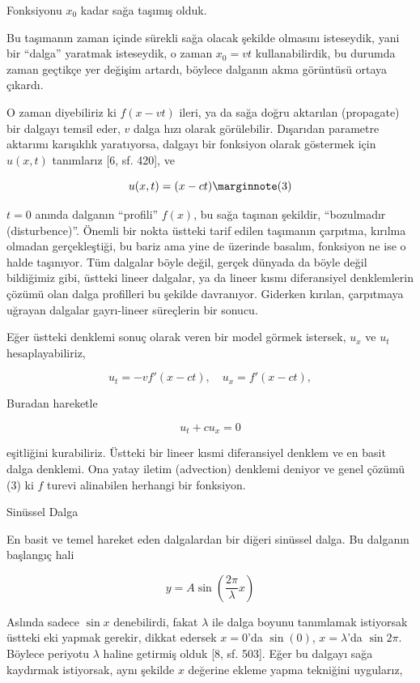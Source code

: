 \documentclass[12pt,fleqn]{article}\usepackage{../../common}
\begin{document}
Fonksiyonu $x_0$ kadar sağa taşımış olduk.

Bu taşımanın zaman içinde sürekli sağa olacak şekilde olmasını isteseydik, yani
bir ``dalga'' yaratmak isteseydik, o zaman $x_0 = v t$ kullanabilirdik, bu
durumda zaman geçtikçe yer değişim artardı, böylece dalganın akma görüntüsü
ortaya çıkardı.

O zaman diyebiliriz ki $f(x-vt)$ ileri, ya da sağa doğru aktarılan (propagate)
bir dalgayı temsil eder, $v$ dalga hızı olarak görülebilir. Dışarıdan parametre
aktarımı karışıklık yaratıyorsa, dalgayı bir fonksiyon olarak göstermek için
$u(x,t)$ tanımlarız [6, sf. 420], ve

$$
u(x,t) = (x - ct)
\mlabel{3}
$$

$t=0$ anında dalganın ``profili'' $f(x)$, bu sağa taşınan şekildir, ``bozulmadır
(disturbence)''. Önemli bir nokta üstteki tarif edilen taşımanın çarpıtma,
kırılma olmadan gerçekleştiği, bu bariz ama yine de üzerinde basalım, fonksiyon
ne ise o halde taşınıyor. Tüm dalgalar böyle değil, gerçek dünyada da böyle
değil bildiğimiz gibi, üstteki lineer dalgalar, ya da lineer kısmı diferansiyel
denklemlerin çözümü olan dalga profilleri bu şekilde davranıyor. Giderken
kırılan, çarpıtmaya uğrayan dalgalar gayrı-lineer süreçlerin bir sonucu.

Eğer üstteki denklemi sonuç olarak veren bir model görmek istersek, $u_x$ ve
$u_t$ hesaplayabiliriz,

$$
u_t = -v f'(x-ct), \quad  u_x = f'(x-ct), 
$$

Buradan hareketle

$$
u_t + c u_x = 0
$$

eşitliğini kurabiliriz. Üstteki bir lineer kısmi diferansiyel denklem ve en
basit dalga denklemi. Ona yatay iletim (advection) denklemi deniyor ve genel
çözümü (3) ki $f$ turevi alinabilen herhangi bir fonksiyon.

Sinüssel Dalga

En basit ve temel hareket eden dalgalardan bir diğeri sinüssel dalga. Bu
dalganın başlangıç hali

$$
y = A \sin \left( \frac{2\pi}{\lambda} x \right)
$$

Aslında sadece $\sin x$ denebilirdi, fakat $\lambda$ ile dalga boyunu tanımlamak
istiyorsak üstteki eki yapmak gerekir, dikkat edersek $x = 0$'da $\sin(0)$,
$x = \lambda$'da  $\sin 2\pi$. Böylece periyotu $\lambda$ haline getirmiş
olduk [8, sf. 503]. Eğer bu dalgayı sağa kaydırmak istiyorsak, aynı şekilde
$x$ değerine ekleme yapma tekniğini uygularız,
\end{document}

